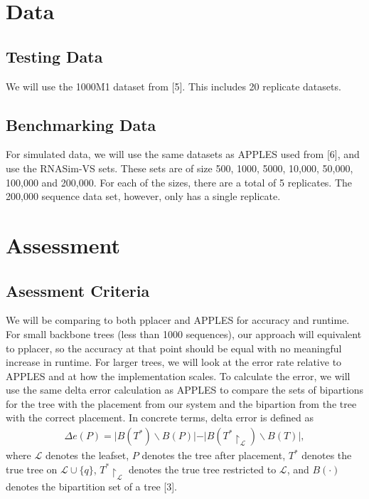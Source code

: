 \documentclass[11pt]{article}
\begin{document}
\section{Data}

\subsection{Testing Data}

We will use the 1000M1 dataset from {[}5{]}. This includes 20 replicate
datasets.

\subsection{Benchmarking Data}

For simulated data, we will use the same datasets as APPLES used from
{[}6{]}, and use the RNASim-VS sets. These sets are of size 500, 1000,
5000, 10,000, 50,000, 100,000 and 200,000. For each of the sizes, there
are a total of 5 replicates. The 200,000 sequence data set, however,
only has a single replicate.

\section{Assessment}

\subsection{Asessment Criteria}

We will be comparing to both pplacer and APPLES for accuracy and
runtime. For small backbone trees (less than 1000 sequences), our
approach will equivalent to pplacer, so the accuracy at that point
should be equal with no meaningful increase in runtime. For larger
trees, we will look at the error rate relative to APPLES and at how the
implementation scales. To calculate the error, we will use the same
delta error calculation as APPLES to compare the sets of bipartions for
the tree with the placement from our system and the bipartion from the
tree with the correct placement. In concrete terms, delta error is
defined as
\begin{align*}
\Delta e(P) = \vert B(T^*) \backslash B(P) \vert - \vert B(T^* \upharpoonright_{\mathcal L}) \backslash B(T)\vert,
\end{align*}
where $\mathcal L$ denotes the leafset, \(P\) denotes the tree
after placement, $T^*$ denotes the true tree on
$\mathcal L \cup \{q\}$, $T^* \upharpoonright_{\mathcal L}$ denotes
the true tree restricted to $\mathcal L$, and $B(\cdot)$ denotes the
bipartition set of a tree {[}3{]}.
\end{document}
